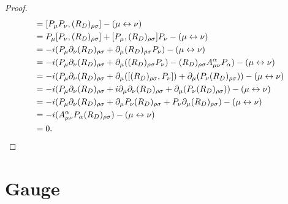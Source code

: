\documentclass[12pt]{article}
\theoremstyle{definition}
\theoremstyle{plain}
\begin{document}
\begin{proof}
	\begin{align*}
		[(R_D)_{\mu\nu},(R_D)_{\rho\sigma}]&=[P_\mu P_\nu,(R_D)_{\rho\sigma}]-(\mu\leftrightarrow \nu)\\
		&=P_\mu [P_\nu,(R_D)_{\rho\sigma}]+[P_\mu,(R_D)_{\rho\sigma}]P_\nu-(\mu\leftrightarrow \nu)\\
		&=-i(P_\mu \partial_\nu (R_D)_{\rho\sigma}+\partial_\mu (R_D)_{\rho\sigma} P_\nu)-(\mu\leftrightarrow \nu)\\
		&=-i(P_\mu \partial_\nu (R_D)_{\rho\sigma}+\partial_\mu ((R_D)_{\rho\sigma} P_\nu)-(R_D)_{\rho\sigma}A_{\mu\nu}^\alpha P_\alpha)-(\mu\leftrightarrow \nu)\\
		&=-i(P_\mu \partial_\nu (R_D)_{\rho\sigma}+\partial_\mu ([(R_D)_{\rho\sigma},P_\nu])+\partial_\mu (P_\nu (R_D)_{\rho\sigma}))-(\mu\leftrightarrow \nu)\\
		&=-i(P_\mu \partial_\nu (R_D)_{\rho\sigma}+i\partial_\mu\partial_\nu (R_D)_{\rho\sigma}+\partial_\mu (P_\nu (R_D)_{\rho\sigma}))-(\mu\leftrightarrow \nu)\\
		&=-i(P_\mu \partial_\nu (R_D)_{\rho\sigma}+\partial_\mu P_\nu (R_D)_{\rho\sigma} +P_\nu \partial_\mu (R_D)_{\rho\sigma})-(\mu\leftrightarrow \nu)\\
		&=-i(A_{\mu\nu}^\alpha P_{\alpha}(R_D)_{\rho\sigma})-(\mu\leftrightarrow \nu)\\
		&=0.\qedhere
	\end{align*}
\end{proof}



\section{Gauge}
\end{document}
